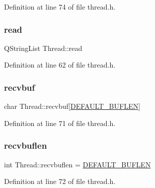 Definition at line 74 of file thread.\+h.

\mbox{\label{class_thread_a45dce23a8d89cb27b41f8823df44765b}} 
\subsubsection{\texorpdfstring{read}{read}}
{\footnotesize\ttfamily Q\+String\+List Thread\+::read\hspace{0.3cm}{\ttfamily [private]}}



Definition at line 62 of file thread.\+h.

\mbox{\label{class_thread_a20474513ec818150b2162ad5604b2166}} 
\subsubsection{\texorpdfstring{recvbuf}{recvbuf}}
{\footnotesize\ttfamily char Thread\+::recvbuf\mbox{[}\mbox{\hyperlink{thread_8h_a5261516a174b035b084a9ae06dc85730}{D\+E\+F\+A\+U\+L\+T\+\_\+\+B\+U\+F\+L\+EN}}\mbox{]}\hspace{0.3cm}{\ttfamily [private]}}



Definition at line 71 of file thread.\+h.

\mbox{\label{class_thread_abc47600f8570a82743be94f54b6092fd}} 
\subsubsection{\texorpdfstring{recvbuflen}{recvbuflen}}
{\footnotesize\ttfamily int Thread\+::recvbuflen = \mbox{\hyperlink{thread_8h_a5261516a174b035b084a9ae06dc85730}{D\+E\+F\+A\+U\+L\+T\+\_\+\+B\+U\+F\+L\+EN}}\hspace{0.3cm}{\ttfamily [private]}}



Definition at line 72 of file thread.\+h.

\mbox{\label{class_thread_ab24e019c57c28ad3116d26c8afeec89a}} 
